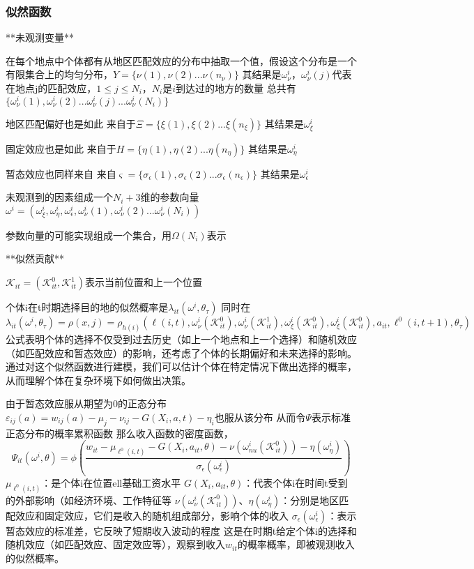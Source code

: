 \documentclass{article}
\numberwithin{equation}{section} %
\begin{document}
\subsubsection{似然函数}

**未观测变量**

在每个地点中个体都有从地区匹配效应的分布中抽取一个值，假设这个分布是一个有限集合上的均匀分布，$Y=\{\nu(1),\nu(2)...\nu(n_{\nu})\}$
其结果是$\omega^{i}_{\nu}$，$\omega^{i}_{\nu}(j)$代表在地点j的匹配效应，$1\leqslant j\leqslant N_i$，$N_i$是$i$到达过的地方的数量
总共有$\{\omega^{i}_{\nu}(1),\omega^{i}_{\nu}(2)...\omega^{i}_{\nu}(j)...\omega^{i}_{\nu}(N_i)\}$

地区匹配偏好也是如此
来自于$\Xi=\{\xi(1),\xi(2)...\xi(n_{\xi})\}$
其结果是$\omega^{i}_{\xi}$

固定效应也是如此
来自于$H=\{\eta(1),\eta(2)...\eta(n_\eta)\}$
其结果是$\omega^{i}_{\eta}$

暂态效应也同样来自
来自$\varsigma=\{\sigma_{\epsilon}(1),\sigma_{\epsilon}(2)...\sigma_{\epsilon}(n_{\epsilon})\}$
其结果是$\omega^{i}_{\epsilon}$

未观测到的因素组成一个$N_{i}+3$维的参数向量$\omega^{i}=(\omega^{i}_{\xi},\omega^{i}_{\eta},\omega^{i}_{\epsilon},\omega^{i}_{\nu}(1),\omega^{i}_{\nu}(2)...\omega^{i}_{\nu}(N_{i}))$

参数向量的可能实现组成一个集合，用$\Omega(N_{i})$表示

**似然贡献**

$\mathcal{K}_{it}=(\mathcal{K}_{it}^{0},\mathcal{K}_{it}^{1})$表示当前位置和上一个位置

个体i在t时期选择目的地的似然概率是$\lambda_{it}(\omega^{i},\theta_{\tau})$
同时在
$\lambda_{it}(\omega^{i},\theta_{\tau})=\rho(x,j)=\rho_{h(i)}(\ell(i,t),\omega_{\nu}^{i}(\mathcal{K}_{it}^{0}),\omega_{\nu}^{i}(\mathcal{K}_{it}^{1}),\omega_{\xi}^{i}(\mathcal{K}_{it}^{0}),\omega_{\xi}^{i}(\mathcal{K}_{it}^{0}),a_{it},\ell^{0}(i,t+1),\theta_{\tau})$
公式表明个体的选择不仅受到过去历史（如上一个地点和上一个选择）和随机效应（如匹配效应和暂态效应）的影响，还考虑了个体的长期偏好和未来选择的影响。
通过对这个似然函数进行建模，我们可以估计个体在特定情况下做出选择的概率，从而理解个体在复杂环境下如何做出决策。


由于暂态效应服从期望为0的正态分布
$\varepsilon_{ij}(a)=w_{ij}(a)-\mu_j-\nu_{ij}-G(X_i,a,t)-\eta_i$也服从该分布
从而令$\Psi$表示标准正态分布的概率累积函数
那么收入函数的密度函数，
$$\Psi_{it}(\omega^{i},\theta)=\phi(\frac{w_{it} - \mu_{\ell^{0}(i,t)}-G(X_{i},a_{it},\theta)-\nu(\omega_{nu}^{i}(\mathcal{K}_{it}^{0}))-\eta(\omega_{\eta}^{i})  }{\sigma_{\epsilon}(\omega_{\epsilon}^{i})})$$
$\mu_{\ell^{0}(i,t)}​$：是个体i在位置ell基础工资水平
$G(X_i, a_{it}, \theta)$：代表个体i在时间t受到的外部影响（如经济环境、工作特征等
$\nu(\omega_{\nu}^i(\mathcal{K}_{it}^0))$、$\eta(\omega_{\eta}^i)$：分别是地区匹配效应和固定效应，它们是收入的随机组成部分，影响个体的收入
$\sigma_{\epsilon}(\omega_{\epsilon}^i)$：表示暂态效应的标准差，它反映了短期收入波动的程度
这是在时期t给定个体i的选择和随机效应（如匹配效应、固定效应等），观察到收入$w_{it}$的概率概率，即被观测收入的似然概率。
\end{document}
